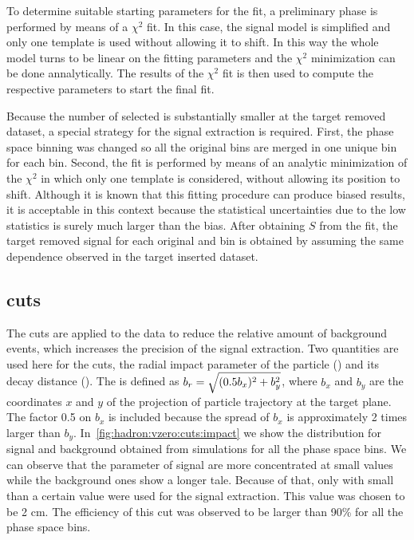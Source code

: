 To determine suitable starting parameters for the fit,
a preliminary phase is performed by means of a $\chi^2$
fit. In this case, the signal model is simplified and
only one template is used without allowing it to shift.
In this way the whole model turns to be linear on the fitting
parameters and the $\chi^2$ minimization can be done annalytically.
The results of the $\chi^2$ fit
is then used to compute the respective parameters
to start the final fit.

Because the number of selected \vzeros is substantially smaller
at the target removed dataset, a special strategy for the signal
extraction is required. First, the phase space binning was
changed so all the original \pT bins are merged
in one unique bin for each \pp bin. Second, the \minv fit is performed
by means of an analytic minimization of the $\chi^2$
in which only one template is considered, without allowing
its position to shift. Although it is known that this fitting
procedure can produce biased results, it is acceptable in this
context because the statistical uncertainties due to the low
statistics is surely much larger than the bias.
After obtaining $S$ from the \minv fit, the target removed
signal for each original \pp and \pT bin is obtained by assuming
the same \pT dependence observed in the target inserted dataset.


\subsection{\vzero cuts}
\label{sec:hadron:vzero:signal:cuts}


The \vzero cuts are applied to the \minv data to reduce
the relative amount of background events, which
increases the precision of the signal extraction. 
Two quantities are used here for the \vzero cuts,
the radial impact parameter of the \vzero particle (\impact)
and its decay distance (\decaydist). The \impact is defined
as $\mbox{$b_r$} = \sqrt{(0.5b_x)^2+b_y^2}$, where $b_x$ and
$b_y$ are the coordinates $x$ and $y$ of the projection of \vzero particle
trajectory at the target plane. The factor 0.5 on $b_x$ is included
because the spread of $b_x$ is approximately 2 times larger than $b_y$.
In~\cref{fig:hadron:vzero:cuts:impact}
we show the \impact distribution for signal and background
obtained from simulations for all the phase space bins.
We can observe that the \impact parameter of signal \vzeros
are more concentrated at small values while the background ones
show a longer tale. Because of that, only \vzeros with \impact
small than a certain value were used for the signal extraction.
This value was chosen to be 2 cm. The efficiency of this cut
was observed to be larger than 90\% for all the phase space bins.

